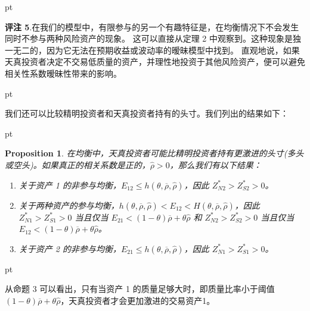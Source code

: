 \documentclass[10.0pt]{article}
\newtheorem{prop}{Proposition}
\begin{document}
 pt



{\bf 评注 5}.在我们的模型中，有限参与的另一个有趣特征是，在均衡情况下不会发生同时不参与两种风险资产的现象。 这可以直接从定理 2 中观察到。这种现象是独一无二的，因为它无法在预期收益或波动率的暧昧模型中找到。 直观地说，如果天真投资者决定不交易低质量的资产，并理性地投资于其他风险资产，便可以避免相关性系数暧昧性带来的影响。

 pt



我们还可以比较精明投资者和天真投资者持有的头寸。我们列出的结果如下：


 pt

\begin{prop}
在均衡中，天真投资者可能比精明投资者持有更激进的头寸(多头或空头)。如果真正的相关系数是正的，$ {\hat \rho} > 0 $，那么我们有以下结果：

\begin{enumerate}
\item [(1).] 关于资产 1 的非参与均衡，$ E_{1 2} \leqslant h (\theta, \overline{\rho}, {\hat \rho}) $，因此 $ Z_ {N 2}^* > Z_{S 2}^* > 0 $。
\item [(2).] 关于两种资产的参与均衡，$ h (\theta, \overline{\rho}, {\hat \rho}) < E_{1 2} < H (\theta, \overline{ \rho}, {\hat \rho}) $，因此 $ Z_{N 1}^* > Z_{S 1}^* > 0 $ 当且仅当 $ E_{2 1} < (1 - \theta ) \overline{\rho} + \theta {\hat \rho} $ 和 $ Z_{N 2}^* > Z_{S 2}^* > 0 $ 当且仅当 $ E_{1 2} < (1 - \theta) \overline{\rho} + \theta {\hat \rho} $。
\item [(3).] 关于资产 2 的非参与均衡，$ E_{2 1} \leqslant h (\theta, \overline{\rho}, {\hat \rho}) $，因此 $ Z_ {N 1}^* > Z_{S 1}^* > 0 $。
\end{enumerate}
\end{prop}




 pt

从命题 3 可以看出，只有当资产 1 的质量足够大时，即质量比率小于阈值 $ (1 - \theta) \overline {\rho} + \theta {\hat \rho} $，天真投资者才会更加激进的交易资产1。

\end{document}
